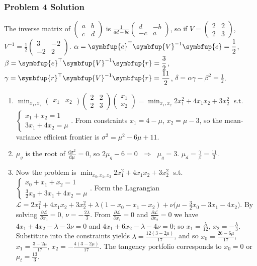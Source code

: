 \documentclass[10pt]{beamer}
\newcommand{\ds}{\displaystyle}
\newcommand{\ie}{\;\Longrightarrow\;}
\newcommand{\vV}{\symbfup{V}}
\newcommand{\ve}{\symbfup{e}}
\newcommand{\vr}{\symbfup{r}}
\theoremstyle{definition}
\begin{document}
\begin{frame}[allowframebreaks]
  \frametitle{Problem 4 Solution}
  The inverse matrix of $\ds\begin{pmatrix}a & b \\ c & d\end{pmatrix}$ is $\ds\frac{1}{ad - bc}\begin{pmatrix}d & -b \\ -c & a\end{pmatrix}$, so if $\ds V = \begin{pmatrix}2 & 2 \\ 2 & 3\end{pmatrix}$, $\ds V^{-1} = \frac{1}{2}\begin{pmatrix}3 & -2 \\ -2 & 2\end{pmatrix}$. $\ds\alpha = \ve^\top\vV^{-1}\ve = \frac{1}{2}$, $\ds\beta = \ve^\top\vV^{-1}\vr = \frac{3}{2}$, $\ds\gamma = \vr^\top\vV^{-1}\vr = \frac{11}{2}$, $\ds\delta = \alpha\gamma - \beta^2 = \frac{1}{2}$.
  \begin{enumerate}
    \item $\ds\min_{x_1, x_2}\begin{pmatrix}x_1 & x_2\end{pmatrix}\begin{pmatrix}2 & 2\\ 2 & 3\end{pmatrix}\begin{pmatrix}x_1 \\ x_2\end{pmatrix} = \min_{x_1, x_2} 2x_1^2 + 4x_1 x_2 + 3x_2^2\;$ s.t. $\ds\begin{cases}x_1 + x_2 = 1 \\ 3x_1 + 4 x_2 = \mu\end{cases}$. From constraints $x_1 = 4 - \mu$, $x_2 = \mu - 3$, so the mean-variance efficient frontier is $\sigma^2 = \mu^2 - 6\mu + 11$.  
    \item $\mu_g$ is the root of $\ds\frac{\text{d}\sigma^2}{\text{d}\mu} = 0$, so $2\mu_g - 6 = 0$ $\ie$ $\mu_g = 3$. $\ds\mu_d = \frac{\gamma}{\beta} = \frac{11}{3}$.
    \item Now the problem is $\ds\min_{x_0, x_1, x_2} 2x_1^2 + 4x_1 x_2 + 3x_2^2\;$ s.t. $\ds\begin{cases}x_0 + x_1 + x_2 = 1 \\ \frac{3}{2}x_0 + 3x_1 + 4 x_2 = \mu\end{cases}$. Form the Lagrangian $\ds\mathcal{L} = 2x_1^2 + 4x_1 x_2 + 3x_2^2 + \lambda(1 - x_0 - x_1 - x_2) + \nu\big(\mu - \frac{3}{2}x_0 - 3x_1 - 4 x_2\big)$. By solving $\ds\frac{\partial\mathcal{L}}{\partial x_0} = 0$, $\ds\nu = -\frac{2\lambda}{3}$. From $\ds\frac{\partial\mathcal{L}}{\partial x_1} = 0$ and $\ds\frac{\partial\mathcal{L}}{\partial x_2} = 0$ we have $4x_1 + 4x_2 - \lambda - 3\nu = 0$ and $4x_1 + 6 x_2 - \lambda - 4\nu = 0$; so $\ds x_1 = \frac{\lambda}{12}$, $\ds x_2 = -\frac{\lambda}{3}$. Substitute into the constraints yields $\ds\lambda = \frac{12(3 - 2\mu)}{17}$, and so $\ds x_0 = \frac{26 - 6\mu}{17}$, $\ds x_1 = \frac{3 - 2\mu}{17}$, $\ds x_2 = -\frac{4(3 - 2\mu)}{17}$. The tangency portfolio corresponds to $x_0 = 0$ or $\ds\mu_t = \frac{13}{3}$.

\end{enumerate}
\end{frame}
\end{document}
